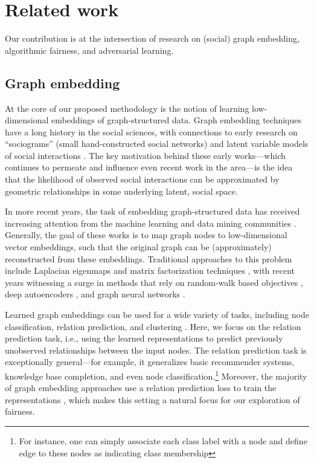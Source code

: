 \section{Related work}

Our contribution is at the intersection of research on (social) graph embedding, algorithmic fairness, and adversarial learning.

\subsection{Graph embedding}
At the core of our proposed methodology is the notion of learning low-dimensional embeddings of graph-structured data.
Graph embedding techniques have a long history in the social sciences, with connections to early research on ``sociograms'' (small hand-constructed social networks) and latent variable models of social interactions \cite{faust1988comparison,majone1972social}.
The key motivation behind these early works---which continues to permeate and influence even recent work in the area---is the idea that the likelihood of observed social interactions can be approximated by geometric relationships in some underlying latent, social space. 

In more recent years, the task of embedding graph-structured data has received increasing attention from the machine learning and data mining communities \cite{cai2018comprehensive,hamilton2017representation}. 
Generally, the goal of these works is to map graph nodes to low-dimensional vector embeddings, such that the original graph can be (approximately) reconstructed from these embeddings.
Traditional approaches to this problem include Laplacian eigenmaps \cite{belkin2002laplacian} and matrix factorization techniques \cite{ng2001spectral}, with recent years witnessing a surge in methods that rely on random-walk based objectives \cite{grover2016node2vec,perozzi2014deepwalk}, deep autoencoders \cite{wang2016structural}, and graph neural networks \cite{hamilton2017inductive,kipf2016variational}. 

Learned graph embeddings can be used for a wide variety of tasks, including node classification, relation prediction, and clustering \cite{hamilton2017representation}.
Here, we focus on the relation prediction task, i.e., using the learned representations to predict previously unobserved relationships between the input nodes.
The relation prediction task is exceptionally general---for example, it generalizes basic recommender systems, knowledge base completion, and even node classification.\footnote{For instance, one can simply associate each class label with a node and define edge to these nodes as indicating class membership}
Moreover, the majority of graph embedding approaches use a relation prediction loss to train the representations \cite{cai2018comprehensive},
which makes this setting a natural focus for our exploration of fairness. 


